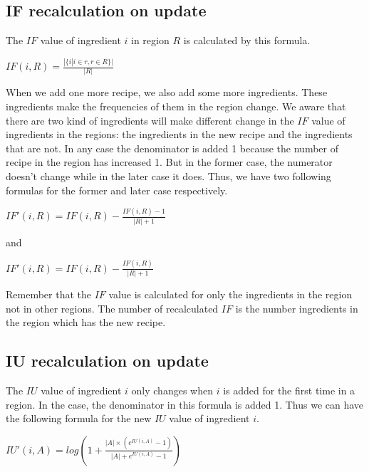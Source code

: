 \subsection{IF recalculation on update}

The $IF$ value of ingredient $i$ in region $R$ is calculated by this formula.
\begin{center}
\smallskip
$ IF(i,R)= \frac{\displaystyle | \{i | i \in r, r \in R \} | }{\displaystyle | R | }$
\smallskip
\label{eq:Ori}
\end{center}

When we add one more recipe, we also add some more ingredients. These ingredients make the frequencies of them in the region change. We aware that there are two kind of ingredients will make different change in the $IF$ value of ingredients in the regions: the ingredients in the new recipe and the ingredients that are not. In any case the denominator is added 1 because the number of recipe in the region has increased 1. But in the former case, the numerator doesn't change while in the later case it does. Thus, we have two following formulas for the former and later case respectively. 

\begin{center}
\smallskip
$ IF'(i,R)=  IF(i,R) - \frac{\displaystyle  IF(i,R)-1 }{\displaystyle | R | +1}$
\smallskip
\end{center}

and 

\begin{center}
\smallskip
$ IF'(i,R)=  IF(i,R) - \frac{\displaystyle  IF(i,R)}{\displaystyle | R | +1}$
\smallskip
\end{center}

Remember that the $IF$ value is calculated for only the ingredients in the region not in other regions. The number of recalculated $IF$ is the number ingredients in the region which has the new recipe.
 
\subsection{IU recalculation on update}

The $IU$ value of ingredient $i$ only changes when $i$ is added for the first time in a region. In the case, the denominator in this formula is added 1. Thus we can have the following formula for the new $IU$ value of ingredient $i$.

\begin{center}
\smallskip
$IU'(i,A)= log{(\displaystyle 1+  \frac{\displaystyle |A|\times(e^{IU(i,A)}-1)}{\displaystyle |A|+e^{IU(i,A)}-1})}$
\smallskip
\end{center}

